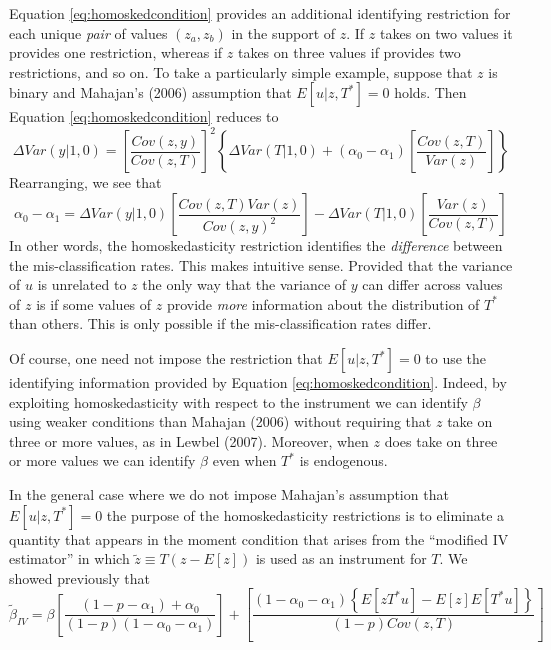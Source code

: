 Equation \ref{eq:homoskedcondition} provides an additional identifying restriction for each unique \emph{pair} of values $(z_a,z_b)$ in the support of $z$.
If $z$ takes on two values it provides one restriction, whereas if $z$ takes on three values if provides two restrictions, and so on.
To take a particularly simple example, suppose that $z$ is binary and Mahajan's (2006) assumption that $E[u|z,T^*] = 0$ holds.
Then Equation \ref{eq:homoskedcondition} reduces to
\begin{equation*}
  \Delta Var(y|1,0) = \left[ \frac{Cov(z,y)}{Cov(z,T)} \right]^2 \left\{\Delta Var(T|1,0) + (\alpha_0 - \alpha_1) \left[ \frac{Cov(z,T)}{Var(z)} \right]  \right\}
\end{equation*}
Rearranging, we see that
\begin{equation*}
  \alpha_0 - \alpha_1 = \Delta Var(y|1,0) \left[ \frac{Cov(z,T)Var(z)}{Cov(z,y)^2} \right] - \Delta Var(T|1,0)\left[ \frac{Var(z)}{Cov(z,T)} \right] 
\end{equation*}
In other words, the homoskedasticity restriction identifies the \emph{difference} between the mis-classification rates.
This makes intuitive sense.
Provided that the variance of $u$ is unrelated to $z$ the only way that the variance of $y$ can differ across values of $z$ is if some values of $z$ provide \emph{more} information about the distribution of $T^*$ than others.
This is only possible if the mis-classification rates differ.

Of course, one need not impose the restriction that $E[u|z,T^*]=0$ to use the identifying information provided by Equation \ref{eq:homoskedcondition}.
Indeed, by exploiting homoskedasticity with respect to the instrument we can identify $\beta$ using weaker conditions than Mahajan (2006) without requiring that $z$ take on three or more values, as in Lewbel (2007).
Moreover, when $z$ does take on three or more values we can identify $\beta$ even when $T^*$ is endogenous.

In the general case where we do not impose Mahajan's assumption that $E[u|z,T^*]=0$ the purpose of the homoskedasticity restrictions is to eliminate a quantity that appears in the moment condition that arises from the ``modified IV estimator'' in which $\widetilde{z} \equiv T\left( z - E[z] \right)$ is used as an instrument for $T$.
We showed previously that 
\begin{equation*}
  \widetilde{\beta}_{IV} = \beta\left[ \frac{\left( 1 - p - \alpha_1 \right) + \alpha_0}{(1-p)(1 - \alpha_0 - \alpha_1)} \right] + \left[ \frac{\left( 1 - \alpha_0 - \alpha_1 \right)\left\{E[zT^*u] - E[z]E[T^*u]  \right\}}{(1-p) Cov(z,T)} \right]
\end{equation*}

